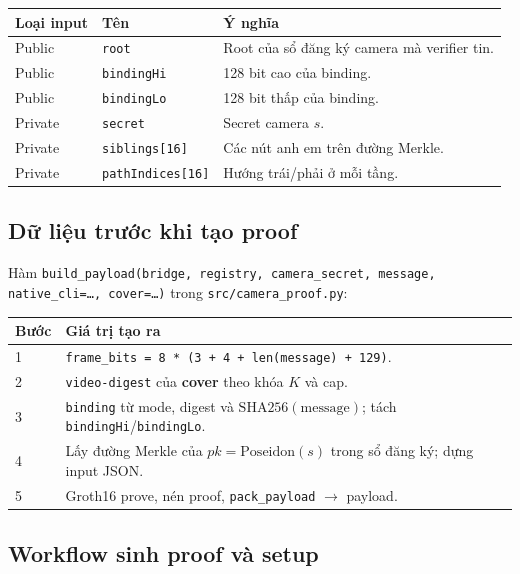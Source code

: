 \documentclass[11pt,a4paper]{article}
\begin{document}
\begin{center}
\begin{tabular}{lll}
\toprule
Loại input & Tên & Ý nghĩa \\
\midrule
Public & \texttt{root} & Root của sổ đăng ký camera mà verifier tin. \\
Public & \texttt{bindingHi} & 128 bit cao của binding. \\
Public & \texttt{bindingLo} & 128 bit thấp của binding. \\
Private & \texttt{secret} & Secret camera \(s\). \\
Private & \texttt{siblings[16]} & Các nút anh em trên đường Merkle. \\
Private & \texttt{pathIndices[16]} & Hướng trái/phải ở mỗi tầng. \\
\bottomrule
\end{tabular}
\end{center}

\subsection{Dữ liệu trước khi tạo proof}

Hàm \texttt{build\_payload(bridge, registry, camera\_secret, message, native\_cli=\ldots,
cover=\ldots)} trong \nolinkurl{src/camera_proof.py}:

\begin{center}
\begin{tabular}{lp{110mm}}
\toprule
Bước & Giá trị tạo ra \\
\midrule
1 & \texttt{frame\_bits = 8 * (3 + 4 + len(message) + 129)}. \\
2 & \texttt{video-digest} của \textbf{cover} theo khóa \(K\) và cap. \\
3 & \texttt{binding} từ mode, digest và \(\mathrm{SHA256}(\text{message})\); tách \texttt{bindingHi}/\texttt{bindingLo}. \\
4 & Lấy đường Merkle của \(pk = \mathrm{Poseidon}(s)\) trong sổ đăng ký; dựng input JSON. \\
5 & Groth16 prove, nén proof, \texttt{pack\_payload} \(\rightarrow\) payload. \\
\bottomrule
\end{tabular}
\end{center}

\subsection{Workflow sinh proof và setup}
\end{document}
